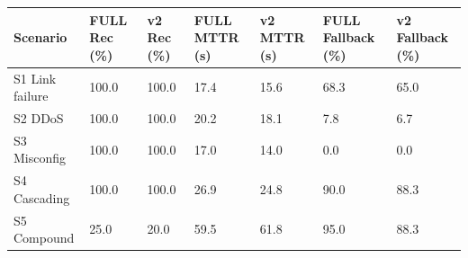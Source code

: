 \begin{tabular}{lllllll}
\toprule
Scenario & FULL Rec (\%) & v2 Rec (\%) & FULL MTTR (s) & v2 MTTR (s) & FULL Fallback (\%) & v2 Fallback (\%) \\
\midrule
S1 Link failure & 100.0 & 100.0 & 17.4 & 15.6 & 68.3 & 65.0 \\
S2 DDoS & 100.0 & 100.0 & 20.2 & 18.1 & 7.8 & 6.7 \\
S3 Misconfig & 100.0 & 100.0 & 17.0 & 14.0 & 0.0 & 0.0 \\
S4 Cascading & 100.0 & 100.0 & 26.9 & 24.8 & 90.0 & 88.3 \\
S5 Compound & 25.0 & 20.0 & 59.5 & 61.8 & 95.0 & 88.3 \\
\bottomrule
\end{tabular}
